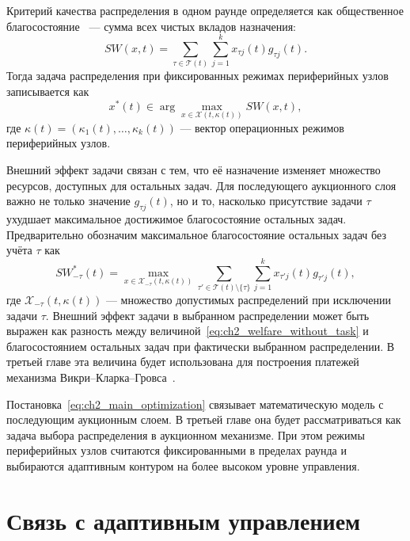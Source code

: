 Критерий качества распределения в одном раунде определяется как общественное благосостояние~\cite{Arrow2011SocialWelfareHandbook} ---  сумма всех чистых вкладов назначения:
\begin{equation}
    SW(x,t)=\sum_{\tau\in\mathcal{T}(t)}\sum_{j=1}^{k}x_{\tau j}(t)g_{\tau j}(t).
    \label{eq:ch2_social_welfare}
\end{equation}
Тогда задача распределения при фиксированных режимах периферийных узлов записывается как
\begin{equation}
    x^*(t)\in\arg\max_{x\in\mathcal{X}(t,\kappa(t))} SW(x,t),
    \label{eq:ch2_main_optimization}
\end{equation}
где $\kappa(t)=(\kappa_1(t),\ldots,\kappa_k(t))$ --- вектор операционных режимов периферийных узлов.

Внешний эффект задачи связан с тем, что её назначение изменяет множество ресурсов, доступных для остальных задач. Для последующего аукционного слоя важно не только значение $g_{\tau j}(t)$, но и то, насколько присутствие задачи $\tau$ ухудшает максимальное достижимое благосостояние остальных задач. Предварительно обозначим максимальное благосостояние остальных задач без учёта $\tau$ как
\begin{equation}
    SW^*_{-\tau}(t)=\max_{x\in\mathcal{X}_{-\tau}(t,\kappa(t))}\sum_{\tau'\in\mathcal{T}(t)\setminus\{\tau\}}\sum_{j=1}^{k}x_{\tau'j}(t)g_{\tau'j}(t),
    \label{eq:ch2_welfare_without_task}
\end{equation}
где $\mathcal{X}_{-\tau}(t,\kappa(t))$ --- множество допустимых распределений при исключении задачи $\tau$. Внешний эффект задачи в выбранном распределении может быть выражен как разность между величиной~\eqref{eq:ch2_welfare_without_task} и благосостоянием остальных задач при фактически выбранном распределении. В третьей главе эта величина будет использована для построения платежей механизма Викри--Кларка--Гровса~\cite{Vickrey1961Counterspeculation,Clarke1971MultipartPricing,Groves1973IncentivesTeams,Nisan2007AlgorithmicGameTheory}.

Постановка~\eqref{eq:ch2_main_optimization} связывает математическую модель с последующим аукционным слоем. В третьей главе она будет рассматриваться как задача выбора распределения в аукционном механизме. При этом режимы периферийных узлов считаются фиксированными в пределах раунда и выбираются адаптивным контуром на более высоком уровне управления.

\section{Связь с адаптивным управлением}

